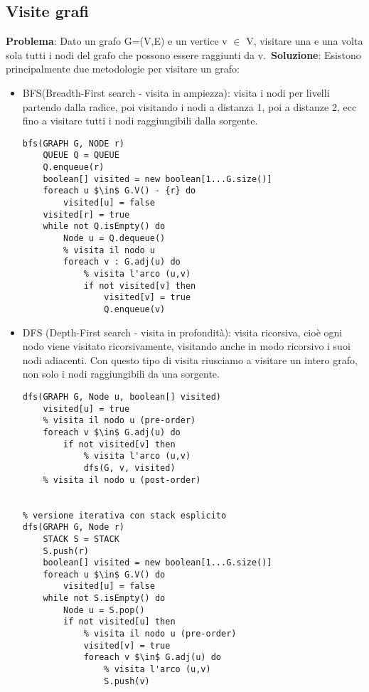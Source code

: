 \documentclass[../cheatSheetAlgoritmi.tex]{subfiles}
\begin{document}
\subsection{Visite grafi}
\textbf{Problema}: Dato un grafo G=(V,E) e un vertice v $\in$ V,
visitare una e una volta sola tutti i nodi del grafo che possono essere raggiunti da v.\
\textbf{Soluzione}: Esistono principalmente due metodologie per visitare un grafo:\
\begin{itemize}
\item BFS(Breadth-First search - visita in ampiezza): visita i nodi per livelli partendo dalla radice, poi visitando i nodi a distanza 1, poi a distanze 2, ecc fino a visitare tutti i nodi raggiungibili dalla sorgente.

\begin{adjustbox}{max width=\linewidth}
\begin{lstlisting}[caption= Visita BFS]
bfs(GRAPH G, NODE r)
	QUEUE Q = QUEUE
	Q.enqueue(r)
	boolean[] visited = new boolean[1...G.size()]
	foreach u $\in$ G.V() - {r} do
		visited[u] = false
	visited[r] = true
	while not Q.isEmpty() do
		Node u = Q.dequeue()
		% visita il nodo u
		foreach v : G.adj(u) do
			% visita l'arco (u,v)
			if not visited[v] then
				visited[v] = true
				Q.enqueue(v)
\end{lstlisting}
\end{adjustbox}
	\item DFS (Depth-First search - visita in profondità): visita ricorsiva, cioè ogni nodo viene visitato ricorsivamente, visitando anche in modo ricorsivo i suoi nodi adiacenti. Con questo tipo di visita riusciamo a visitare un intero grafo, non solo i nodi raggiungibili da una sorgente.
\begin{adjustbox}{max width=\linewidth}
\begin{lstlisting}[caption= Visita DFS]
% versione ricorsiva con stack implicito
dfs(GRAPH G, Node u, boolean[] visited)
	visited[u] = true
	% visita il nodo u (pre-order)
	foreach v $\in$ G.adj(u) do
		if not visited[v] then
			% visita l'arco (u,v)
			dfs(G, v, visited)
	% visita il nodo u (post-order)


% versione iterativa con stack esplicito
dfs(GRAPH G, Node r)
	STACK S = STACK
	S.push(r)
	boolean[] visited = new boolean[1...G.size()]
	foreach u $\in$ G.V() do
		visited[u] = false
	while not S.isEmpty() do
		Node u = S.pop()
		if not visited[u] then
			% visita il nodo u (pre-order)
			visited[v] = true
			foreach v $\in$ G.adj(u) do
				% visita l'arco (u,v)
				S.push(v)
\end{lstlisting}
\end{adjustbox}
\end{itemize}
\newpage
\end{document}
